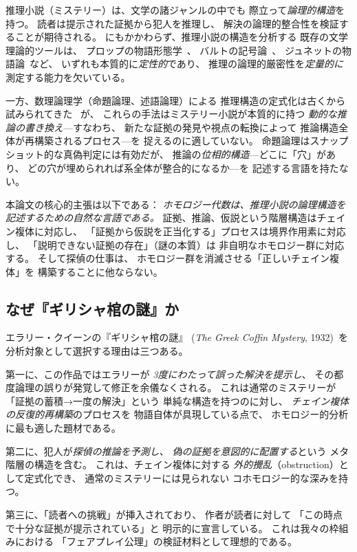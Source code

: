 \documentclass[12pt,twocolumn]{ltjsarticle}
\begin{document}
推理小説（ミステリー）は、文学の諸ジャンルの中でも
際立って\emph{論理的構造}を持つ。
読者は提示された証拠から犯人を推理し、
解決の論理的整合性を検証することが期待される。
にもかかわらず、推理小説の構造を分析する
既存の文学理論的ツールは、
プロップの物語形態学~\cite{Propp1928}、
バルトの記号論~\cite{Barthes1966}、
ジュネットの物語論~\cite{Genette1972}など、
いずれも本質的に\emph{定性的}であり、
推理の論理的厳密性を\emph{定量的に}測定する能力を欠いている。

一方、数理論理学（命題論理、述語論理）による
推理構造の定式化は古くから試みられてきた
~\cite{Smullyan1978}が、
これらの手法はミステリー小説が本質的に持つ
\emph{動的な推論の書き換え}---すなわち、
新たな証拠の発見や視点の転換によって
推論構造全体が再構築されるプロセス---を
捉えるのに適していない。
命題論理はスナップショット的な真偽判定には有効だが、
推論の\emph{位相的構造}---どこに「穴」があり、
どの穴が埋められれば系全体が整合的になるか---を
記述する言語を持たない。

本論文の核心的主張は以下である：
\emph{ホモロジー代数は、推理小説の論理構造を
記述するための自然な言語である。}
証拠、推論、仮説という階層構造はチェイン複体に対応し、
「証拠から仮説を正当化する」プロセスは境界作用素に対応し、
「説明できない証拠の存在」（謎の本質）は
非自明なホモロジー群に対応する。
そして探偵の仕事は、
ホモロジー群を消滅させる「正しいチェイン複体」を
構築することに他ならない。


\subsection{なぜ『ギリシャ棺の謎』か}

エラリー・クイーンの『ギリシャ棺の謎』
(\textit{The Greek Coffin Mystery}, 1932)~\cite{Queen1932}を
分析対象として選択する理由は三つある。

第一に、この作品ではエラリーが
\emph{3度にわたって誤った解決を提示し}、
その都度論理の誤りが発覚して修正を余儀なくされる。
これは通常のミステリーが
「証拠の蓄積→一度の解決」という
単純な構造を持つのに対し、
\emph{チェイン複体の反復的再構築}のプロセスを
物語自体が具現している点で、
ホモロジー的分析に最も適した題材である。

第二に、犯人が\emph{探偵の推論を予測し、
偽の証拠を意図的に配置する}という
メタ階層の構造を含む。
これは、チェイン複体に対する
\emph{外的攪乱}（obstruction）として定式化でき、
通常のミステリーには見られない
コホモロジー的な深みを持つ。

第三に、「読者への挑戦」が挿入されており、
作者が読者に対して
「この時点で十分な証拠が提示されている」と
明示的に宣言している。
これは我々の枠組みにおける
「フェアプレイ公理」の検証材料として理想的である。
\end{document}
